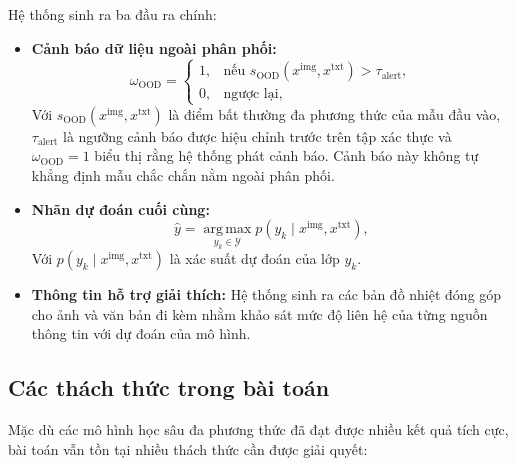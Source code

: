 Hệ thống sinh ra ba đầu ra chính:

\begin{itemize}
\item \textbf{Cảnh báo dữ liệu ngoài phân phối:}
    \[
        \omega_{\mathrm{OOD}}
        =
        \begin{cases}
            1,
            & \text{nếu }
            s_{\mathrm{OOD}}\left(
                x^{\mathrm{img}},x^{\mathrm{txt}}
            \right) > \tau_{\mathrm{alert}}, \\[4pt]
            0,
            & \text{ngược lại},
        \end{cases}
    \]
Với $s_{\mathrm{OOD}}\left(x^{\mathrm{img}},x^{\mathrm{txt}}\right)$ là điểm bất thường đa phương thức của mẫu đầu vào, $\tau_{\mathrm{alert}}$ là ngưỡng cảnh báo được hiệu chỉnh trước trên tập xác thực và $\omega_{\mathrm{OOD}}=1$ biểu thị rằng hệ thống phát cảnh báo. Cảnh báo này không tự khẳng định mẫu chắc chắn nằm ngoài phân phối.

\item \textbf{Nhãn dự đoán cuối cùng:}
    \[
        \hat{y}
        =
        \operatorname*{arg\,max}_{y_k \in \mathcal{Y}}
        p\left(
        y_k \mid x^{\mathrm{img}},x^{\mathrm{txt}}
        \right),
    \]
Với $p\left(y_k \mid x^{\mathrm{img}},x^{\mathrm{txt}}\right)$ là xác suất dự đoán của lớp $y_k$.

\item \textbf{Thông tin hỗ trợ giải thích:}
Hệ thống sinh ra các bản đồ nhiệt đóng góp cho ảnh và văn bản đi kèm nhằm khảo sát mức độ liên hệ của từng nguồn thông tin với dự đoán của mô hình.
\end{itemize}

\pagebreak

\subsection{Các thách thức trong bài toán}
\label{sec:challenges}
Mặc dù các mô hình học sâu đa phương thức đã đạt được nhiều kết quả tích cực, bài toán vẫn tồn tại nhiều thách thức cần được giải quyết:

